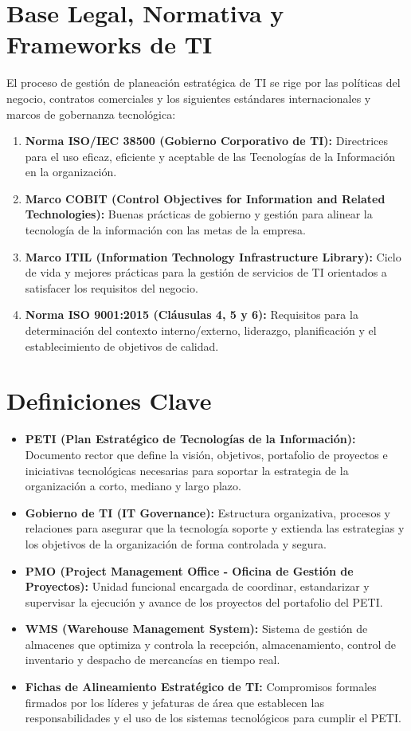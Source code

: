 \documentclass[11pt,letterpaper]{report}
\begin{document}
\section{Base Legal, Normativa y Frameworks de TI}
El proceso de gestión de planeación estratégica de TI se rige por las políticas del negocio, contratos comerciales y los siguientes estándares internacionales y marcos de gobernanza tecnológica:
\begin{enumerate}
  \item \textbf{Norma ISO/IEC 38500 (Gobierno Corporativo de TI):} Directrices para el uso eficaz, eficiente y aceptable de las Tecnologías de la Información en la organización.
  \item \textbf{Marco COBIT (Control Objectives for Information and Related Technologies):} Buenas prácticas de gobierno y gestión para alinear la tecnología de la información con las metas de la empresa.
  \item \textbf{Marco ITIL (Information Technology Infrastructure Library):} Ciclo de vida y mejores prácticas para la gestión de servicios de TI orientados a satisfacer los requisitos del negocio.
  \item \textbf{Norma ISO 9001:2015 (Cláusulas 4, 5 y 6):} Requisitos para la determinación del contexto interno/externo, liderazgo, planificación y el establecimiento de objetivos de calidad.
\end{enumerate}

\section{Definiciones Clave}
\begin{itemize}
  \item \textbf{PETI (Plan Estratégico de Tecnologías de la Información):} Documento rector que define la visión, objetivos, portafolio de proyectos e iniciativas tecnológicas necesarias para soportar la estrategia de la organización a corto, mediano y largo plazo.
  \item \textbf{Gobierno de TI (IT Governance):} Estructura organizativa, procesos y relaciones para asegurar que la tecnología soporte y extienda las estrategias y los objetivos de la organización de forma controlada y segura.
  \item \textbf{PMO (Project Management Office - Oficina de Gestión de Proyectos):} Unidad funcional encargada de coordinar, estandarizar y supervisar la ejecución y avance de los proyectos del portafolio del PETI.
  \item \textbf{WMS (Warehouse Management System):} Sistema de gestión de almacenes que optimiza y controla la recepción, almacenamiento, control de inventario y despacho de mercancías en tiempo real.
  \item \textbf{Fichas de Alineamiento Estratégico de TI:} Compromisos formales firmados por los líderes y jefaturas de área que establecen las responsabilidades y el uso de los sistemas tecnológicos para cumplir el PETI.
\end{itemize}
\end{document}
